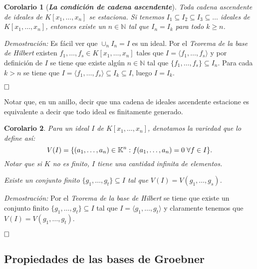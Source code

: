 \documentclass[12pt]{article}
\newtheorem{corolario}{Corolario}[theorem]
\begin{document}
\begin{corolario}[\textbf{\textit{La condición de cadena ascendente}}]
Toda cadena ascendente de ideales de $K[x_1, \ldots, x_n]$ se estaciona. Si tenemos $I_1 \subseteq I_2 \subseteq I_3 \subseteq \ldots$ ideales de $K[x_1, \ldots, x_n]$, entonces existe un $n \in \mathbb{N}$ tal que $I_n = I_k$ para todo $k \geq n$.
\end{corolario}
\emph{Demostración: }Es fácil ver que $\cup_n I_n = I$ es un ideal. Por el \textit{Teorema de la base de Hilbert} existen $f_1, \ldots, f_s \in K[x_1, \ldots, x_n]$ tales que $I = \langle f_1, \ldots, f_s \rangle$ y por definición de $I$ se tiene que existe algún $n \in \mathbb{N}$ tal que $\lbrace f_1, \ldots, f_s \rbrace \subseteq I_n$. Para cada $k >n$ se tiene que $I = \langle f_1, \ldots, f_s \rangle \subseteq I_k \subseteq I$, luego $I = I_k$. 

$\hfill \square$

Notar que, en un anillo, decir que una cadena de ideales ascendente estacione es equivalente a decir que todo ideal es finitamente generado.

\begin{corolario}Para un ideal $I$ de $K[x_1, \ldots, x_n]$, denotamos la variedad que lo define así: $$V(I) = \lbrace (a_1, \ldots, a_n) \in \mathbb{K}^n: f(a_1, \ldots, a_n)=0 \hspace{0.1cm} \forall f \in I \rbrace.$$ Notar que si $K$ no es finito, $I$ tiene una cantidad infinita de elementos. 

Existe un conjunto finito $\lbrace g_1, \ldots, g_t \rbrace \subseteq I$ tal que $V(I) = V(g_1, \ldots, g_s)$.
\end{corolario}
\emph{Demostración: }Por el \textit{Teorema de la base de Hilbert} se tiene que existe un conjunto finito $\lbrace g_1, \ldots, g_t \rbrace \subseteq I$ tal que $I = \langle g_1, \ldots, g_t \rangle$ y claramente tenemos que $V(I) = V(g_1, \ldots, g_t)$.

$\hfill \square$


\subsection{Propiedades de las bases de Groebner}
\end{document}
